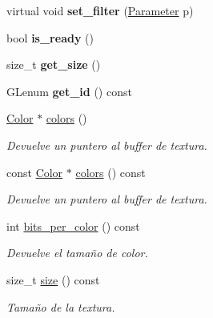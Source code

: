 \begin{DoxyCompactItemize}
\item 
\mbox{\label{classexample_1_1_texture_a87fd7cd0857095d2b9169ca082b3753e}} 
virtual void {\bfseries set\+\_\+filter} (\mbox{\hyperlink{classexample_1_1_texture_a4f7233e69c4a5b913dbe53d729c1765f}{Parameter}} p)
\item 
\mbox{\label{classexample_1_1_texture_a3684ba4f0866c9b550227142ee92ec3a}} 
bool {\bfseries is\+\_\+ready} ()
\item 
\mbox{\label{classexample_1_1_texture_a5f682b2607f13441e07340b11a240ca5}} 
size\+\_\+t {\bfseries get\+\_\+size} ()
\item 
\mbox{\label{classexample_1_1_texture_ad35ea1f981a04abe620d1e2aa4e548d4}} 
G\+Lenum {\bfseries get\+\_\+id} () const
\item 
\mbox{\hyperlink{classexample_1_1_color___r_g_b_a8888}{Color}} $\ast$ \mbox{\hyperlink{classexample_1_1_texture_ab613441c591db8dccfe13573eb1684d4}{colors}} ()
\begin{DoxyCompactList}\small\item\em Devuelve un puntero al buffer de textura. \end{DoxyCompactList}\item 
const \mbox{\hyperlink{classexample_1_1_color___r_g_b_a8888}{Color}} $\ast$ \mbox{\hyperlink{classexample_1_1_texture_adc2795254d224cfca3d4056d5bc4b963}{colors}} () const
\begin{DoxyCompactList}\small\item\em Devuelve un puntero al buffer de textura. \end{DoxyCompactList}\item 
int \mbox{\hyperlink{classexample_1_1_texture_adbd81b5ef83a13ee25fb0006040a3db9}{bits\+\_\+per\+\_\+color}} () const
\begin{DoxyCompactList}\small\item\em Devuelve el tamaño de color. \end{DoxyCompactList}\item 
size\+\_\+t \mbox{\hyperlink{classexample_1_1_texture_a4d3fa18e34255967abbc678bd96e79a9}{size}} () const
\begin{DoxyCompactList}\small\item\em Tamaño de la textura. \end{DoxyCompactList}\item 

\end{DoxyCompactItemize}
